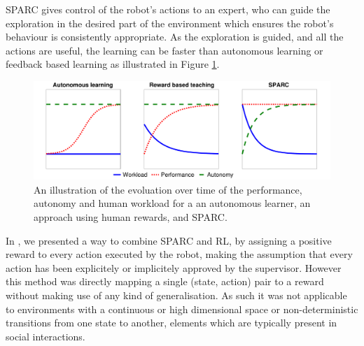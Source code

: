 \documentclass[letterpaper]{article} %
\begin{document}
SPARC gives control of the robot's actions to an expert, who can guide the
exploration in the desired part of the environment which ensures the robot's
behaviour is consistently appropriate. As the exploration is
guided, and all the actions are useful, the learning can be faster than
autonomous learning or feedback based learning as illustrated in Figure
\ref{fig:comparison}.

\begin{figure}
    \centering
    \includegraphics[width=0.9\linewidth]{./fig/motivation.pdf}
    \caption{An illustration of the evoluation over time of the performance, autonomy and human workload for a
    an autonomous learner, an approach using human rewards, and SPARC.}
    \label{fig:comparison}
\end{figure}


In \cite{senft2017supervised}, we presented a way to combine SPARC and RL, by
assigning a positive reward to every action executed by the robot, making the assumption that every action has been explicitely or implicitely approved by the supervisor. However this method
was  directly mapping a single (state, action) pair to a reward without making
use of any kind of generalisation. As such it was not applicable to
environments with a continuous or high dimensional space or non-deterministic
transitions from one state to another, elements which are typically present in social interactions.
\end{document}
